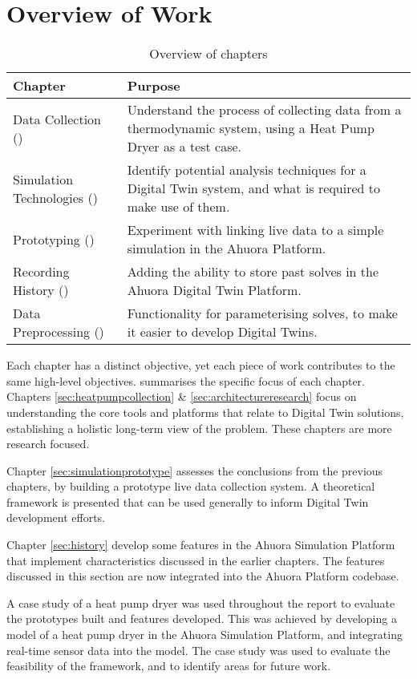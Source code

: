 \section{Overview of Work}

\begin{table}[ht]
    \centering
    \caption{Overview of chapters}
    \label{tab:research_chapters}
    \begin{tabular}{|L{4.5cm}|p{11.5cm}|}
    \hline
    \textbf{Chapter} & \textbf{Purpose} \\
    \hline
    Data Collection \mbox{()}& Understand the process of collecting data from a thermodynamic system, using a Heat Pump Dryer as a test case. \\ \hline
    Simulation Technologies \mbox{()}& Identify potential analysis techniques for a Digital Twin system, and what is required to make use of them. \\\hline
    Prototyping \mbox{()}& Experiment with linking live data to a simple simulation in the Ahuora Platform. \\\hline
    Recording History \mbox{()}& Adding the ability to store past solves in the Ahuora Digital Twin Platform. \\\hline
    Data Preprocessing \mbox{()}& Functionality for parameterising solves, to make it easier to develop Digital Twins. \\
    \hline
    \end{tabular}
\end{table}

Each chapter has a distinct objective, yet each piece of work contributes to the same high-level objectives.  summarises the specific focus of each chapter. 
Chapters \ref{sec:heatpumpcollection} \& \ref{sec:architectureresearch} focus on understanding the core tools and platforms that relate to Digital Twin solutions, establishing a holistic long-term view of the problem. These chapters are more research focused.

Chapter \ref{sec:simulationprototype} assesses the conclusions from the previous chapters, by building a prototype live data collection system. A theoretical framework is presented that can be used generally to inform Digital Twin development efforts. 

Chapter \ref{sec:history} develop some features in the Ahuora Simulation Platform that implement characteristics discussed in the earlier chapters. The features discussed in this section are now integrated into the Ahuora Platform codebase.

A case study of a heat pump dryer was used throughout the report to evaluate the prototypes built and features developed.  This was achieved by developing a model of a heat pump dryer in the Ahuora Simulation Platform, and integrating real-time sensor data into the model. The case study was used to evaluate the feasibility of the framework, and to identify areas for future work.
